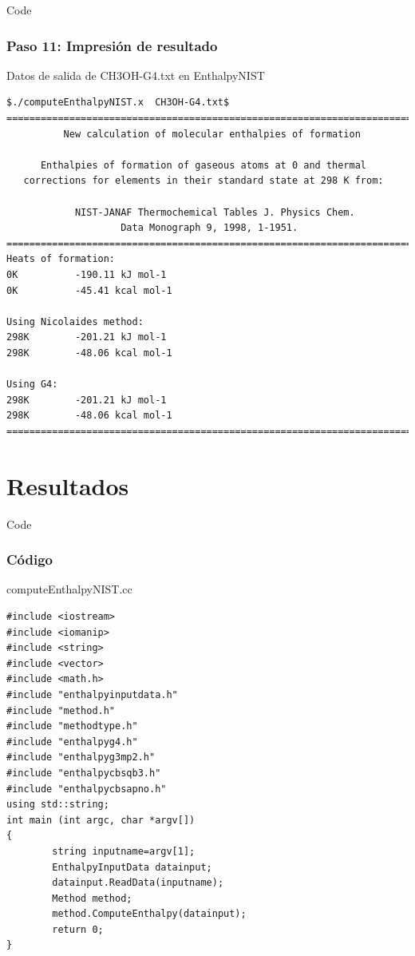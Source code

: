 \documentclass{beamer}
\begin{document}

\begin{frame}[fragile]{Code}
\frametitle{Paso 11: Impresión de resultado}

\begin{block}{Datos de salida de CH3OH-G4.txt en EnthalpyNIST}
\begin{lstlisting}
$./computeEnthalpyNIST.x  CH3OH-G4.txt$
========================================================================
          New calculation of molecular enthalpies of formation

      Enthalpies of formation of gaseous atoms at 0 and thermal 
   corrections for elements in their standard state at 298 K from:

            NIST-JANAF Thermochemical Tables J. Physics Chem. 
                    Data Monograph 9, 1998, 1-1951.
========================================================================
Heats of formation:
0K          -190.11 kJ mol-1
0K          -45.41 kcal mol-1

Using Nicolaides method:
298K        -201.21 kJ mol-1
298K        -48.06 kcal mol-1

Using G4: 
298K        -201.21 kJ mol-1
298K        -48.06 kcal mol-1
========================================================================
\end{lstlisting}
\end{block}
\end{frame}


\section{Resultados}
\begin{frame}[fragile]{Code}
\frametitle{Código}

\begin{block}{computeEnthalpyNIST.cc}
\begin{lstlisting}
#include <iostream>
#include <iomanip>
#include <string>
#include <vector>
#include <math.h>
#include "enthalpyinputdata.h"
#include "method.h"
#include "methodtype.h"
#include "enthalpyg4.h"
#include "enthalpyg3mp2.h"
#include "enthalpycbsqb3.h"
#include "enthalpycbsapno.h"
using std::string;
int main (int argc, char *argv[])
{    
        string inputname=argv[1];
        EnthalpyInputData datainput;
        datainput.ReadData(inputname);    
        Method method;
        method.ComputeEnthalpy(datainput);    
        return 0;
}
\end{lstlisting}
\end{block}
\end{frame}
\end{document}
